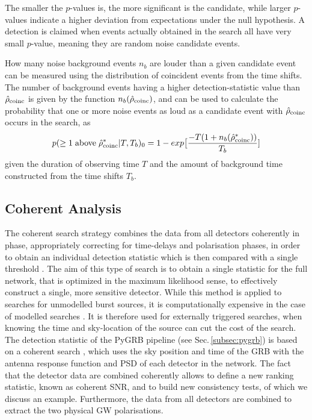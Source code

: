 \documentclass[binding=0.6cm, LaM]{sapthesis}
\begin{document}
	The smaller the $p$-values is, the more significant is the candidate,
	while larger $p$-values indicate a higher deviation from expectations under the null hypothesis.
	A detection is claimed when events actually obtained in the search all have very small $p$-value,
	meaning they are random noise candidate events.

	How many noise background events $n_b$ are louder than a given candidate event
	can be measured using the distribution of coincident events from the time shifts.
	The number of background events having a higher detection-statistic value than $\hat{\rho}_{\rm coinc}$
	is given by the function $n_b(\hat{\rho}_{\rm coinc})$, and can be used to calculate 
	the probability that one or more noise events as loud as a candidate event with $\hat{\rho}_{\rm coinc}$
	occurs in the search, as 
        \begin{equation}
          p(\geq 1 \hspace*{0.1cm}\text{above}\hspace*{0.1cm} \hat{\rho}_{\rm coinc}^*|T,T_b)_0 = 1 - exp\big[ {{-T(1+n_b(\hat{\rho}_{\rm coinc}^*))} \over {T_b}}]
        \end{equation}
	 given the duration of observing time $T$ and the amount of background time 
	constructed from the time shifts $T_b$. \cite{28}

\subsection{Coherent Analysis}
\label{subsec:coherent}
	The coherent search strategy combines the data from all detectors coherently in phase, 
	appropriately correcting for time-delays and polarisation phases, in order
	to obtain an individual detection statistic which is then compared with a single threshold \cite{18}. 
	The aim of this type of search is to obtain a single statistic for the full 
	network, that is optimized in the maximum likelihood sense, 
	to effectively construct a single, more sensitive detector.
 	While this method is applied to searches for unmodelled burst sources,
        it is computationally expensive in the case of modelled searches \cite{45}.  
	It is therefore used for externally triggered searches, 
	when knowing the time and sky-location of the source can cut the cost of the search.
	The detection statistic of the {\ttfamily PyGRB} pipeline (see Sec.\,\ref{subsec:pygrb}) 
	is based on a coherent search \cite{46, 92},
	which uses the sky position and time of the GRB with the antenna response function and PSD of each detector in the network. 
        The fact that the detector data are combined coherently allows to define a new ranking statistic, 
	known as coherent SNR, and to build new consistency tests, of which we discuss an example.
	Furthermore, the data from all detectors are combined to extract the two physical GW polarisations. 
\end{document}
